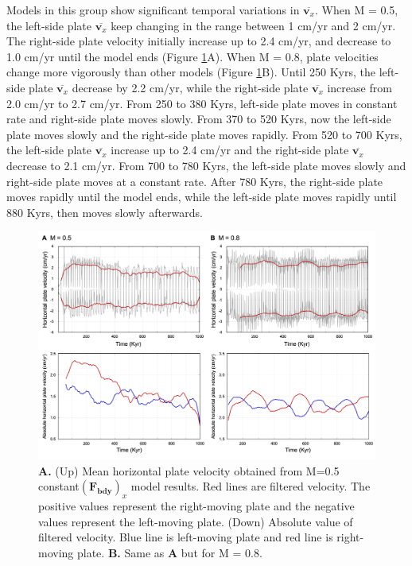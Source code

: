 \documentclass[letterpaper,12pt,notitle]{memphisthesis}                     %
\begin{document}
Models in this group show significant temporal variations in $\overline{\boldsymbol{v}_x}$. 
When M = 0.5, the left-side plate $\overline{\boldsymbol{v}_x}$ keep changing in the range between 1 cm/yr and 2 cm/yr. The right-side plate velocity initially increase up to 2.4 cm/yr, and decrease to 1.0 cm/yr until the model ends (Figure \ref{fig:fbmhv}A).
When M = 0.8, plate velocities change more vigorously than other models (Figure \ref{fig:fbmhv}B). Until 250 Kyrs, the left-side plate $\overline{\boldsymbol{v}_x}$ decrease by 2.2 cm/yr, while the right-side plate  $\overline{\boldsymbol{v}_x}$ increase from 2.0 cm/yr to 2.7 cm/yr. From 250 to 380 Kyrs, left-side plate moves in constant rate and right-side plate moves slowly. From 370 to 520 Kyrs, now the left-side plate moves slowly and the right-side plate moves rapidly. From 520 to 700 Kyrs, the left-side plate $\overline{\boldsymbol{v}_x}$ increase up to 2.4 cm/yr and the right-side plate $\overline{\boldsymbol{v}_x}$ decrease to 2.1 cm/yr. From 700 to 780 Kyrs, the left-side plate moves slowly and right-side plate moves at a constant rate. After 780 Kyrs, the right-side plate moves rapidly until the model ends, while the left-side plate moves rapidly until 880 Kyrs, then moves slowly afterwards.
%
\begin{figure}[!htb]
	\centering
	\includegraphics[width=0.98\linewidth,trim=4 4 4 4,clip]{./figs/fbmhv.png}
	\caption{\textbf{A.} (Up) Mean horizontal plate velocity obtained from M=0.5 constant$(\boldsymbol{F_{bdy}})_x$ model results. Red lines are filtered velocity. The positive values represent the right-moving plate and the negative values represent the left-moving plate. (Down) Absolute value of filtered velocity. Blue line is left-moving plate and red line is right-moving plate. \textbf{B.} Same as \textbf{A} but for M = 0.8.}
	\label{fig:fbmhv}
\end{figure}
\end{document}
